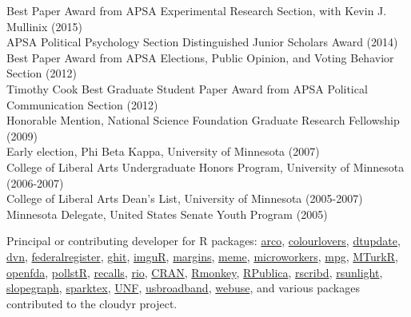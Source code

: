 \documentclass[12pt]{article}
\renewcommand{\section}[1]{\pagebreak[3]%
    \llap{\scshape\smash{\parbox[t]{\marginparwidth}{\raggedright {\color{lg}#1}}}}%
    \vspace{-\baselineskip}\par}
\newcommand{\entry}[1]{\indent {\color{lg}\guillemotright}\hspace{2pt}#1\vspace{.25em}\\}
\begin{document}
\section{Honors\\and\\Awards}
\entry{Best Paper Award from APSA Experimental Research Section, with Kevin J. Mullinix (2015)}
\entry{APSA Political Psychology Section Distinguished Junior Scholars Award (2014)}
\entry{Best Paper Award from APSA Elections, Public Opinion, and Voting Behavior Section (2012)}
\entry{Timothy Cook Best Graduate Student Paper Award from APSA Political Communication Section (2012)}
\entry{Honorable Mention, National Science Foundation Graduate Research Fellowship (2009)}
\entry{Early election, Phi Beta Kappa, University of Minnesota (2007)}
\entry{College of Liberal Arts Undergraduate Honors Program, University of Minnesota (2006-2007)}
\entry{College of Liberal Arts Dean's List, University of Minnesota (2005-2007)}
\entry{Minnesota Delegate, United States Senate Youth Program (2005)}

\section{Software Development}
\entry{Principal or contributing developer for R packages: \href{https://github.com/leeper/arco}{arco}, \href{https://cran.r-project.org/package=colourlovers}{colourlovers}, \href{https://github.com/hrbrmstr/dtupdate}{dtupdate}, \href{https://cran.r-project.org/package=dvn}{dvn}, \href{https://github.com/rOpenGov/federalregister}{federalregister}, \href{https://github.com/leeper/ghit}{ghit}, \href{https://cran.r-project.org/package=imguR}{imguR}, \href{https://github.com/leeper/margins}{margins}, \href{https://github.com/leeper/meme}{meme}, \href{https://github.com/leeper/microworkers}{microworkers}, \href{https://github.com/rOpenGov/mpg}{mpg}, \href{https://cran.r-project.org/package=MTurkR}{MTurkR}, \href{https://github.com/ropenhealth/openfda}{openfda}, \href{https://cran.r-project.org/package=pollstR}{pollstR}, \href{https://github.com/rOpenGov/recalls}{recalls}, \href{https://cran.r-project.org/package=rio}{rio}, \href{https://cran.r-project.org/package=rite}{CRAN}, \href{https://cran.r-project.org/package=Rmonkey}{Rmonkey}, \href{https://github.com/rOpenGov/RPublica}{RPublica}, \href{https://github.com/leeper/rscribd}{rscribd}, \href{https://cran.r-project.org/package=rsunlight}{rsunlight}, \href{https://github.com/leeper/slopegraph}{slopegraph}, \href{https://cran.r-project.org/package=sparktex}{sparktex}, \href{https://cran.r-project.org/package=UNF}{UNF}, \href{https://github.com/rOpenGov/usbroadband}{usbroadband}, \href{https://cran.r-project.org/package=webuse}{webuse}, and various packages contributed to the cloudyr project.}
\end{document}
